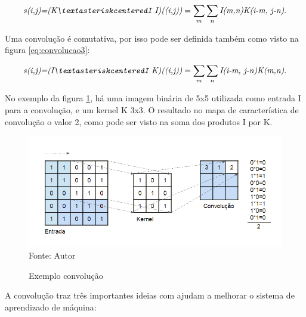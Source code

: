\documentclass[
	12pt,				%
    oneside,			%
	a4paper,			%
	english,			%
	french,				%
	spanish,			%
	brazil,				%
	]{abntex2}
\begin{document}
\begin{equation}
\centering
    \textit{s(i,j)=(K\textasteriskcenteredI I)((i,j))} = \sum_{m} \sum_{n} \textit{I(m,n)K(i-m, j-n)} .
    \label{eq:convolucao2}
\end{equation}

Uma convolução é comutativa, por isso pode ser definida também como visto na figura \ref{eq:convolucao3}:

\begin{equation}
\centering
    \textit{s(i,j)=(I\textasteriskcenteredI K)((i,j))} = \sum_{m} \sum_{n} \textit{I(i-m, j-n)K(m,n)} .
    \label{eq:convolucao3}
\end{equation}


No exemplo da figura \ref{fig:convolução}, há uma imagem binária de 5x5 utilizada como entrada I para a convolução, e um kernel K 3x3. O resultado no mapa de característica de convolução o valor 2, como pode ser visto na soma dos produtos I por K.

\begin{figure}[H]
    \centering
    \caption{Exemplo convolução}
    \includegraphics[scale=0.65]{convolucao1}\\
    Fonte: Autor\hfill
    \label{fig:convolução}
\end{figure}

A convolução traz três importantes ideias com ajudam a melhorar o sistema de aprendizado de máquina:
\end{document}
